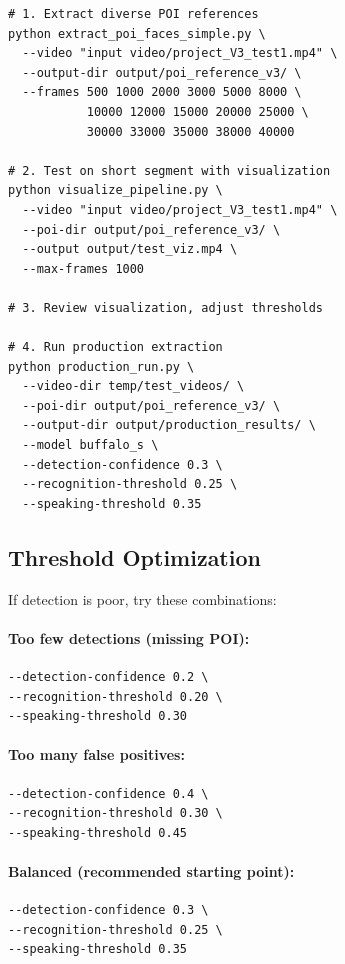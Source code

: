 \documentclass[11pt,a4paper]{article}
\begin{document}
\begin{lstlisting}[style=bashcode]
# 1. Extract diverse POI references
python extract_poi_faces_simple.py \
  --video "input video/project_V3_test1.mp4" \
  --output-dir output/poi_reference_v3/ \
  --frames 500 1000 2000 3000 5000 8000 \
           10000 12000 15000 20000 25000 \
           30000 33000 35000 38000 40000

# 2. Test on short segment with visualization
python visualize_pipeline.py \
  --video "input video/project_V3_test1.mp4" \
  --poi-dir output/poi_reference_v3/ \
  --output output/test_viz.mp4 \
  --max-frames 1000

# 3. Review visualization, adjust thresholds

# 4. Run production extraction
python production_run.py \
  --video-dir temp/test_videos/ \
  --poi-dir output/poi_reference_v3/ \
  --output-dir output/production_results/ \
  --model buffalo_s \
  --detection-confidence 0.3 \
  --recognition-threshold 0.25 \
  --speaking-threshold 0.35
\end{lstlisting}

\subsection{Threshold Optimization}

If detection is poor, try these combinations:

\paragraph{Too few detections (missing POI):}
\begin{lstlisting}[style=bashcode]
--detection-confidence 0.2 \
--recognition-threshold 0.20 \
--speaking-threshold 0.30
\end{lstlisting}

\paragraph{Too many false positives:}
\begin{lstlisting}[style=bashcode]
--detection-confidence 0.4 \
--recognition-threshold 0.30 \
--speaking-threshold 0.45
\end{lstlisting}

\paragraph{Balanced (recommended starting point):}
\begin{lstlisting}[style=bashcode]
--detection-confidence 0.3 \
--recognition-threshold 0.25 \
--speaking-threshold 0.35
\end{lstlisting}
\end{document}
